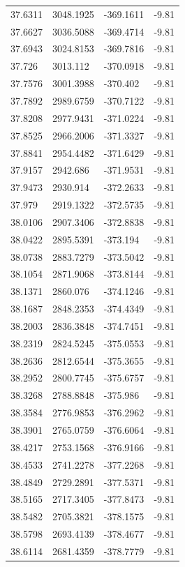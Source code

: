 \begin{table}[H]
\begin{tabular}{llll}
37.6311 & 3048.1925 & -369.1611 & -9.81 \\
37.6627 & 3036.5088 & -369.4714 & -9.81 \\
37.6943 & 3024.8153 & -369.7816 & -9.81 \\
37.726 & 3013.112 & -370.0918 & -9.81 \\
37.7576 & 3001.3988 & -370.402 & -9.81 \\
37.7892 & 2989.6759 & -370.7122 & -9.81 \\
37.8208 & 2977.9431 & -371.0224 & -9.81 \\
37.8525 & 2966.2006 & -371.3327 & -9.81 \\
37.8841 & 2954.4482 & -371.6429 & -9.81 \\
37.9157 & 2942.686 & -371.9531 & -9.81 \\
37.9473 & 2930.914 & -372.2633 & -9.81 \\
37.979 & 2919.1322 & -372.5735 & -9.81 \\
38.0106 & 2907.3406 & -372.8838 & -9.81 \\
38.0422 & 2895.5391 & -373.194 & -9.81 \\
38.0738 & 2883.7279 & -373.5042 & -9.81 \\
38.1054 & 2871.9068 & -373.8144 & -9.81 \\
38.1371 & 2860.076 & -374.1246 & -9.81 \\
38.1687 & 2848.2353 & -374.4349 & -9.81 \\
38.2003 & 2836.3848 & -374.7451 & -9.81 \\
38.2319 & 2824.5245 & -375.0553 & -9.81 \\
38.2636 & 2812.6544 & -375.3655 & -9.81 \\
38.2952 & 2800.7745 & -375.6757 & -9.81 \\
38.3268 & 2788.8848 & -375.986 & -9.81 \\
38.3584 & 2776.9853 & -376.2962 & -9.81 \\
38.3901 & 2765.0759 & -376.6064 & -9.81 \\
38.4217 & 2753.1568 & -376.9166 & -9.81 \\
38.4533 & 2741.2278 & -377.2268 & -9.81 \\
38.4849 & 2729.2891 & -377.5371 & -9.81 \\
38.5165 & 2717.3405 & -377.8473 & -9.81 \\
38.5482 & 2705.3821 & -378.1575 & -9.81 \\
38.5798 & 2693.4139 & -378.4677 & -9.81 \\
38.6114 & 2681.4359 & -378.7779 & -9.81 \\

\end{tabular}
\end{table}
